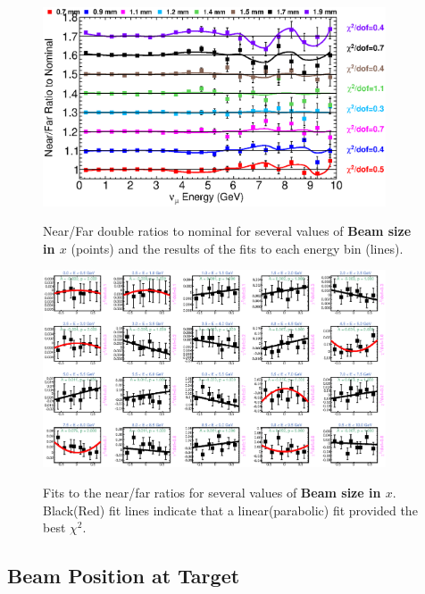 \begin{figure}[ht]
  \begin{center}
    {\includegraphics[width=4.0in]{figures/BeamSigmaX_nof_summary.eps}}
  \end{center}
\caption{ Near/Far double ratios to nominal for several values of {\bf Beam size in $x$} (points) and the results of the fits to each energy bin (lines).}
\end{figure}

\begin{figure}[hb]
  \begin{center}
    {\includegraphics[width=4.0in]{figures/BeamSigmaY_nof_fits.eps}}
  \end{center}
\caption{ Fits to the near/far ratios for several values of {\bf Beam size in $x$}. Black(Red) fit lines indicate that a linear(parabolic) fit provided the best $\chi^2$. }
\end{figure}

\subsection{Beam Position at Target}

